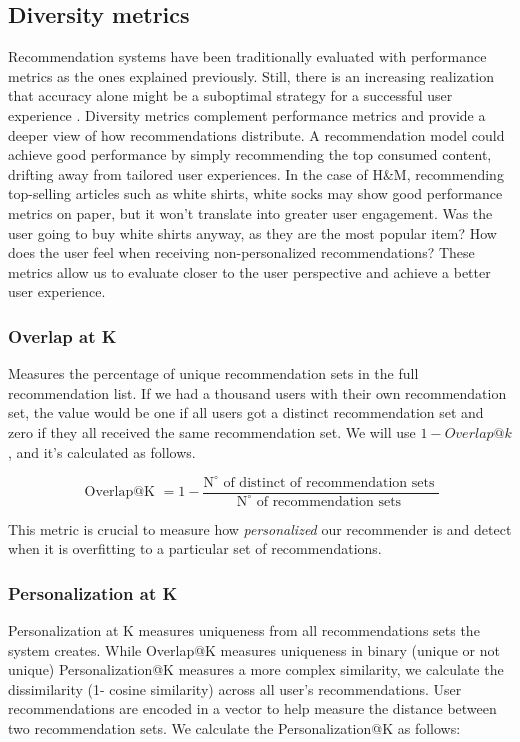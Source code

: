 \documentclass{kththesis}
\begin{document}
\subsection{Diversity metrics}
Recommendation systems have been traditionally evaluated with performance metrics as the ones explained previously. Still, there is an increasing realization that accuracy alone might be a suboptimal strategy for a successful user experience \cite{noveltyintro}.
Diversity metrics complement performance metrics and provide a deeper view of how recommendations distribute. A recommendation model could achieve good performance by simply recommending the top consumed content, drifting away from tailored user experiences. In the case of H\&M, recommending top-selling articles such as white shirts, white socks may show good performance metrics on paper, but it won't translate into greater user engagement. Was the user going to buy white shirts anyway, as they are the most popular item? How does the user feel when receiving non-personalized recommendations? These metrics allow us to evaluate closer to the user perspective and achieve a better user experience.

\subsubsection{Overlap at K}
Measures the percentage of unique recommendation sets in the full recommendation list. If we had a thousand users with their own recommendation set, the value would be one if all users got a distinct recommendation set and zero if they all received the same recommendation set. We will use $1-Overlap@k$, and it's calculated as follows. 

\begin{equation}
\text { Overlap@K }= 1 -  \frac{\mathrm{N}^{\circ} \text { of distinct of recommendation sets }}{\mathrm{N}^{\circ} \text { of recommendation sets }}
\end{equation}

This metric is crucial to measure how \textit{personalized} our recommender is and detect when it is overfitting to a particular set of recommendations. 
\subsubsection{Personalization at K}
Personalization at K measures uniqueness from all recommendations sets the system creates. While Overlap@K measures uniqueness in binary (unique or not unique) Personalization@K measures a more complex similarity, we calculate the dissimilarity (1- cosine similarity) across all user's recommendations. User recommendations are encoded in a vector to help measure the distance between two recommendation sets. We calculate the Personalization@K as follows:
\end{document}
